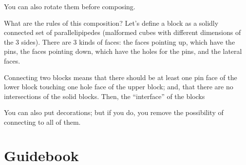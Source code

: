 
You can also rotate them before composing.


What are the rules of this composition? Let's define a block as a solidly connected set of parallelipipedes (malformed cubes with different dimensions of the 3 sides). There are 3 kinds of faces: the faces pointing up, which have the pins, the faces pointing down, which have the holes for the pins, and the lateral faces.

Connecting two blocks means that there should be at least one pin face of the lower block touching one hole face of the upper block; and, that there are no intersections of the solid blocks. Then, the ``interface'' of the blocks


You can also put decorations; but if you do, you remove the possibility of connecting to all of them.



\section{Guidebook}



